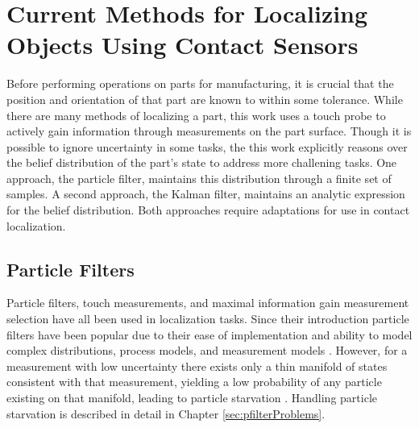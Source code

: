 \documentclass[../thesis.tex]{subfiles}
\begin{document}
\section{Current Methods for Localizing Objects Using Contact Sensors}

Before performing operations on parts for manufacturing, it is crucial that the position and orientation of that part are known to within some tolerance.
While there are many methods of localizing a part, this work uses a touch probe to actively gain information through measurements on the part surface.
Though it is possible to ignore uncertainty in some tasks, the this work explicitly reasons over the belief distribution of the part's state to address more challening tasks.
One approach, the particle filter, maintains this distribution through a finite set of samples.
A second approach, the Kalman filter, maintains an analytic expression for the belief distribution.
Both approaches require adaptations for use in contact localization.





\subsection{Particle Filters}
Particle filters, touch measurements, and maximal information gain measurement selection have all been used in localization tasks. 
Since their introduction particle filters have been popular due to their ease of implementation and ability to model complex distributions, process models, and measurement models \cite{Thrun2000a}. 
However, for a measurement with low uncertainty there exists only a thin manifold of states consistent with that measurement, yielding a low probability of any particle existing on that manifold, leading to particle starvation \cite{Thrun2000}.
Handling particle starvation is described in detail in Chapter \ref{sec:pfilterProblems}.
\end{document}
